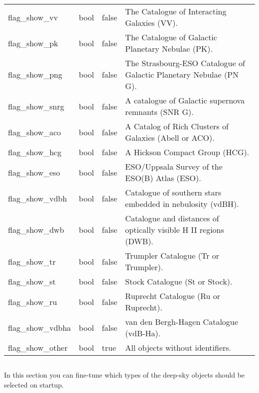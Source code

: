 \begin{longtable}{l|l|l|p{90mm}}
flag\_show\_vv    & bool & false & The Catalogue of Interacting Galaxies (VV). \\%
flag\_show\_pk    & bool & false & The Catalogue of Galactic Planetary Nebulae (PK). \\%
flag\_show\_png   & bool & false & The Strasbourg-ESO Catalogue of Galactic Planetary Nebulae (PN G). \\%
flag\_show\_snrg  & bool & false & A catalogue of Galactic supernova remnants (SNR G). \\%
flag\_show\_aco   & bool & false & A Catalog of Rich Clusters of Galaxies (Abell or ACO). \\%
flag\_show\_hcg   & bool & false & A Hickson Compact Group (HCG). \\%
flag\_show\_eso   & bool & false & ESO/Uppsala Survey of the ESO(B) Atlas (ESO). \\%
flag\_show\_vdbh  & bool & false & Catalogue of southern stars embedded in nebulosity (vdBH). \\%
flag\_show\_dwb   & bool & false & Catalogue and distances of optically visible H II regions (DWB). \\%
flag\_show\_tr    & bool & false & Trumpler Catalogue (Tr or Trumpler). \\%
flag\_show\_st    & bool & false & Stock Catalogue (St or Stock). \\%
flag\_show\_ru    & bool & false & Ruprecht Catalogue (Ru or Ruprecht). \\%
flag\_show\_vdbha & bool & false & van den Bergh-Hagen Catalogue (vdB-Ha). \\%
flag\_show\_other & bool & true & All objects without identifiers. \\\bottomrule
\end{longtable}

\subsection{}
In this section you can fine-tune which types of the deep-sky objects should be selected on startup.

